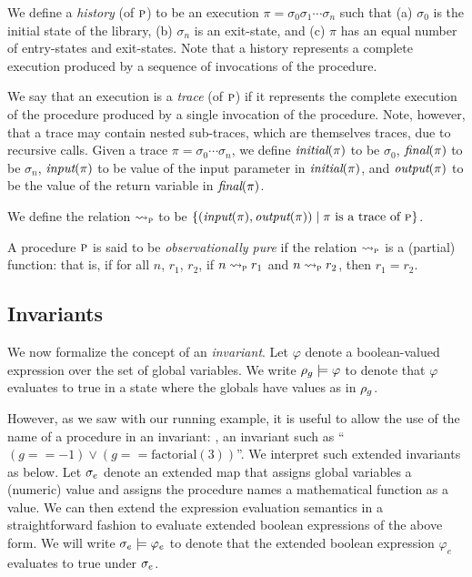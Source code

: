 We define a \emph{history} (of $\textsc{p}$) to be an execution $\pi = \sigma_0 \sigma_1 \cdots \sigma_n$ such that
(a) $\sigma_0$ is the initial state of the library,
(b) $\sigma_n$ is an exit-state, and
(c) $\pi$ has an equal number of entry-states and exit-states.
Note that a history represents a complete  execution produced by a
sequence of invocations of the procedure.

We say that an execution is a \emph{trace} (of $\textsc{p}$) if it represents the complete execution
of the procedure produced by a single invocation of the procedure.
Note, however, that a trace may contain nested sub-traces,
which are themselves traces, due to recursive calls.
Given a trace $\pi = \sigma_0 \cdots \sigma_n$, we define
$\textit{initial}(\pi)$ to be $\sigma_0$,
$\textit{final}(\pi)$ to be $\sigma_n$,
$\textit{input}(\pi)$ to be value of the input parameter in $\textit{initial}(\pi)$,
and $\textit{output}(\pi)$ to be the value of the return variable in $\textit{final}(\pi)$.

We define the relation $\rightsquigarrow_{\textsc{p}}$ to be $\{ (\textit{input}(\pi),\textit{output}(\pi)) \; | \; \pi \text{ is a trace of } \textsc{p} \}$.

\begin{definition}
A procedure $\textsc{p}$ is said to be \emph{observationally pure} if the relation $\rightsquigarrow_{\textsc{p}}$ is a (partial) function:
that is, if for all $n$, $r_1$, $r_2$, if  $n \rightsquigarrow_{\textsc{p}} r_1$ and $n \rightsquigarrow_{\textsc{p}} r_2$, then $r_1 = r_2$.
\end{definition}

\subsection*{Invariants}

We now formalize the concept of an \emph{invariant}. Let $\varphi$ denote a boolean-valued expression over
the set of global variables. We write $\rho_g \models \varphi$ to denote that $\varphi$ evaluates to true in a state
where the globals have values as in $\rho_g$.

However, as we saw with our running example, it is useful to allow the use of the name of a procedure in
an invariant: \eg, an invariant such as ``$(g == -1) \vee (g == \text{factorial}(3))$''.
We interpret such extended invariants as below.
Let $\sigma_e$ denote an extended map that assigns global variables a (numeric) value and assigns the
procedure names a mathematical function as a value. We can then extend the expression evaluation semantics
in a straightforward fashion to evaluate extended boolean expressions of the above form. 
We will write $\sigma_e \models \varphi_e$ to denote that the extended boolean expression $\varphi_e$
evaluates to true under $\sigma_e$.

